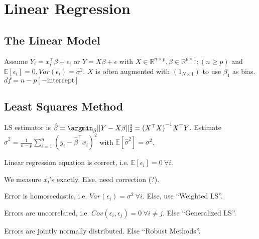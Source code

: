 \section{Linear Regression}\label{sec:multiple_linear_regression}
\subsection{The Linear Model}\label{subsec:the_linear_model}
\begin{sectionbox}\nospacing{}
  Assume $Y_i = x_{i}^{\top}\beta + \epsilon_{i}$ or $Y = X \beta + \epsilon$ with $X \in \mathbb{R}^{n \times p}, \beta \in \mathbb{R}^{p \times 1}; (n \geq p)$ and $\mathbb{E}[\epsilon_{i}]=0, Var(\epsilon_{i}) = \sigma^{2}$.
  $X$ is often augmented with $(1_{N\times 1})$ to use $\beta_{1}$ as bias.
  $df=n - p [-\text{intercept}]$
\end{sectionbox}
\subsection{Least Squares Method}\label{subsec:least_squares_method}
\begin{sectionbox}\nospacing{}
  LS estimator is $\hat \beta = \argmin_{\beta} ||Y - X\beta||^{2}_{2} = {(X^{\top}X)}^{-1} X^{\top}Y $.
  Estimate $\hat{\sigma}^{2} = \frac{1}{n-p}\sum_{i=1}^{n}(y_i-\hat{\beta}^\top x_i)^{2}$ with $\mathbb{E}[\hat{\sigma}^{2}] = \sigma^{2}$.
\end{sectionbox}

\begin{notebox}\nospacing{}
  \begin{enumeratenosep}[label=\roman*]
    \item Linear regression equation is correct, i.e. $\mathbb{E}[\epsilon_{i}]=0\ \forall i$.
    \item We measure $x_{i}$'s exactly. Else, need correction (?).
    \item Error is homoscedastic, i.e. $Var(\epsilon_{i})=\sigma^{2}\ \forall i$. Else, use ``Weighted LS''.
    \item Errors are uncorrelated, i.e. $Cov(\epsilon_{i}, \epsilon_{j}) = 0\ \forall i \neq j$. Else ``Generalized LS''.
    \item Errors are jointly normally distributed. Else ``Robust Methods''.
  \end{enumeratenosep}
\end{notebox}

